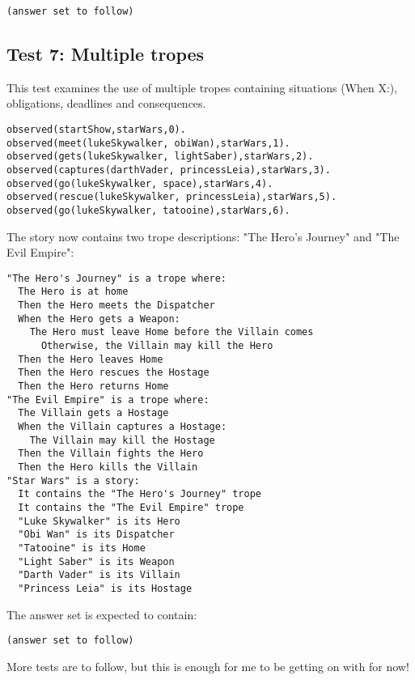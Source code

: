 \documentclass[11pt]{article}
\begin{document}
\begin{verbatim}
(answer set to follow)
\end{verbatim}

\subsection{Test 7: Multiple tropes}
\label{sec:orgheadline8}

This test examines the use of multiple tropes containing situations (When X:), obligations, deadlines and consequences.

\begin{verbatim}
observed(startShow,starWars,0).
observed(meet(lukeSkywalker, obiWan),starWars,1).
observed(gets(lukeSkywalker, lightSaber),starWars,2).
observed(captures(darthVader, princessLeia),starWars,3).
observed(go(lukeSkywalker, space),starWars,4).
observed(rescue(lukeSkywalker, princessLeia),starWars,5).
observed(go(lukeSkywalker, tatooine),starWars,6).
\end{verbatim}

The story now contains two trope descriptions: "The Hero's Journey" and "The Evil Empire":

\begin{verbatim}
"The Hero's Journey" is a trope where:
  The Hero is at home
  Then the Hero meets the Dispatcher
  When the Hero gets a Weapon:
    The Hero must leave Home before the Villain comes
      Otherwise, the Villain may kill the Hero
  Then the Hero leaves Home
  Then the Hero rescues the Hostage
  Then the Hero returns Home
"The Evil Empire" is a trope where:
  The Villain gets a Hostage
  When the Villain captures a Hostage:
    The Villain may kill the Hostage
  Then the Villain fights the Hero
  Then the Hero kills the Villain
"Star Wars" is a story:
  It contains the "The Hero's Journey" trope
  It contains the "The Evil Empire" trope
  "Luke Skywalker" is its Hero
  "Obi Wan" is its Dispatcher
  "Tatooine" is its Home
  "Light Saber" is its Weapon
  "Darth Vader" is its Villain
  "Princess Leia" is its Hostage
\end{verbatim}

The answer set is expected to contain:

\begin{verbatim}
(answer set to follow)
\end{verbatim}

More tests are to follow, but this is enough for me to be getting on with for now!
\end{document}
